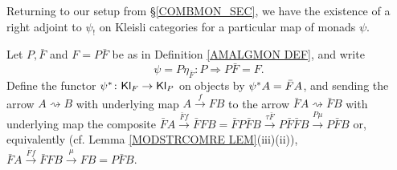 \documentclass[a4paper,10pt
,draft
]{article}%
\renewcommand{\1}{\eta}%
\newcommand{\Kl}{\mathsf{Kl}}
\begin{document}
Returning to our setup from \S \ref{COMBMON_SEC},
we have the existence of a right adjoint to $\psi_!$ on Kleisli categories for a particular map of monads $\psi$.

\begin{definition}
      Let $P,\bar{F}$ and $F = P \bar{F}$ be as in 
      Definition \ref{AMALGMON DEF},
      and write
      \[
            \psi = P\eta_{\bar F} \colon P \Rightarrow P \bar{F} = F.
      \]
      Define the functor
      $\psi^{\**} \colon \Kl_F \to \Kl_P$
      on objects by
      $\psi^{\**}A = \bar{F} A$,
      and sending the arrow
      $A \rightsquigarrow B$
      with underlying map
      $A \xrightarrow{f} FB$
      to the arrow 
      $\bar{F} A \rightsquigarrow \bar{F} B$
      with underlying map the composite
      $\bar{F} A \xrightarrow{\bar{F}f} \bar{F} FB
      =
      \bar{F}P \bar{F} B \xrightarrow{\tau \bar{F}}
      P \bar{F} \bar{F} B \xrightarrow{P \mu}
      P\bar{F}B$
      or, equivalently (cf. Lemma \ref{MODSTRCOMRE LEM}(iii)(ii)),
      $\bar{F} A \xrightarrow{\bar{F}f} \bar{F} FB
      \xrightarrow{\mu} FB = P\bar{F}B$.
\end{definition}
\end{document}
